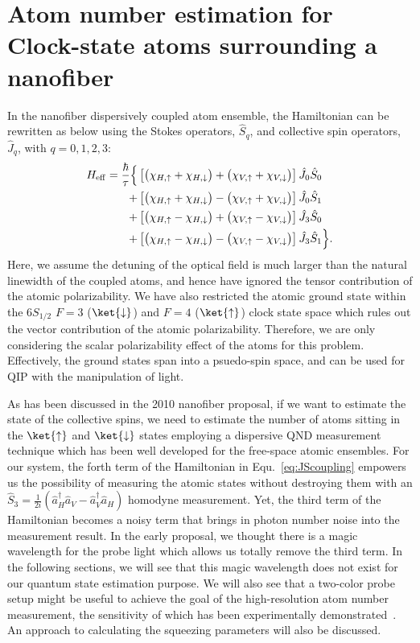 \chapter{Atom number estimation for Clock-state atoms surrounding a nanofiber}
In the nanofiber dispersively coupled atom ensemble, the Hamiltonian can be rewritten as below using the Stokes operators, $ \hat{S}_q $, and collective spin operators, $ \hat{J}_q $, with $ q=0,1,2,3 $:
\begin{align}
H_{\rm eff} 
=\frac{\hbar}{\tau} \Big\{ & \left[ \big( \chi_{H,\uparrow} + \chi_{H,\downarrow}\big) + \big(\chi_{V,\uparrow} + \chi_{V,\downarrow}\big) \right] \hat{J}_0 \hat{S}_0 \nonumber \\
+ & \left[ \big( \chi_{H, \uparrow} + \chi_{H,\downarrow}\big) - \big( \chi_{V,\uparrow} + \chi_{V,\downarrow} \big)\right]  \hat{J}_0 \hat{S}_1 \nonumber \\
+ & \left[ \big( \chi_{H,\uparrow} - \chi_{H,\downarrow}\big) + \big(\chi_{V,\uparrow} - \chi_{V,\downarrow} \big) \right] \hat{J}_3 \hat{S}_0 \nonumber \\
+ & \left[ \big( \chi_{H,\uparrow} - \chi_{H,\downarrow}\big) - \big(\chi_{V,\uparrow} - \chi_{V,\downarrow} \big) \right]  \hat{J}_3 \hat{S}_1\Big\}.\label{eq:JScoupling}
\end{align}
Here, we assume the detuning of the optical field is much larger than the natural linewidth of the coupled atoms, and hence have ignored the tensor contribution of the atomic polarizability. We have also restricted the atomic ground state within the $ 6S_{1/2} $ $ F=3 $ ($ \ket{\downarrow} $) and $ F=4 $ ($ \ket{\uparrow} $) clock state space which rules out the vector contribution of the atomic polarizability. Therefore, we are only considering the scalar polarizability effect of the atoms for this problem. Effectively, the ground states span into a psuedo-spin space, and can be used for QIP with the manipulation of light. 

As has been discussed in the 2010 nanofiber proposal, if we want to estimate the state of the collective spins, we need to estimate the number of atoms sitting in the $ \ket{\uparrow} $ and $ \ket{\downarrow} $ states employing a dispersive QND measurement technique which has been well developed for the free-space atomic ensembles. For our system, the forth term of the Hamiltonian in Equ.~\eqref{eq:JScoupling} empowers us the possibility of measuring the atomic states without destroying them with an $ \hat{S}_3=\frac{1}{2i}(\hat{a}_H^\dagger\hat{a}_V - \hat{a}_V^\dagger\hat{a}_H) $ homodyne measurement. Yet, the third term of the Hamiltonian becomes a noisy term that brings in photon number noise into the measurement result. In the early proposal, we thought there is a magic wavelength for the probe light which allows us totally remove the third term. In the following sections, we will see that this magic wavelength does not exist for our quantum state estimation purpose. We will also see that a two-color probe setup might be useful to achieve the goal of the high-resolution atom number measurement, the sensitivity of which has been experimentally demonstrated~\cite{Beguin2014}. An approach to calculating the squeezing parameters will also be discussed.

